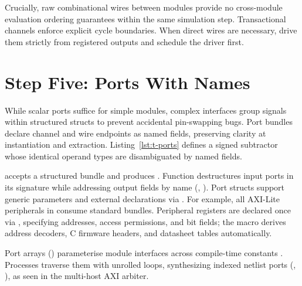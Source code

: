 \documentclass[journal,9pt]{IEEEtran}
\begin{document}


Crucially, raw combinational wires between modules provide no cross-module
evaluation ordering guarantees within the same simulation step. Transactional
channels enforce explicit cycle boundaries. When direct wires are necessary,
drive them strictly from registered outputs and schedule the driver first.

\section{Step Five: Ports With Names}
\label{sec:t-ports}

While scalar ports suffice for simple modules, complex interfaces group signals
within structured structs to prevent accidental pin-swapping bugs. Port bundles
declare channel and wire endpoints as named fields, preserving clarity at
instantiation and extraction. Listing~\ref{lst:t-ports} defines a signed
subtractor whose identical operand types are disambiguated by named fields.



 accepts a structured  bundle and produces
. Function  destructures input ports in its signature
while addressing output fields by name (, ).
Port structs support generic parameters and external declarations via
. For example, all AXI-Lite peripherals in
 consume standard  bundles. Peripheral
registers are declared once via , specifying addresses, access
permissions, and bit fields; the macro derives address decoders, C firmware
headers, and datasheet tables automatically.

Port arrays () parameterise module interfaces across
compile-time constants . Processes traverse them with unrolled
 loops, synthesizing indexed netlist ports (,
), as seen in the multi-host AXI arbiter.
\end{document}
